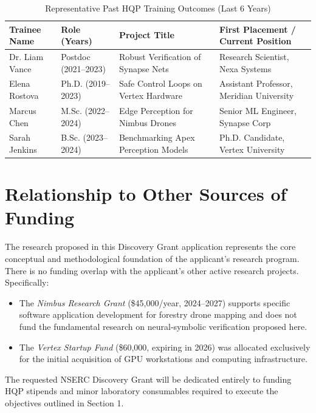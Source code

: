 \documentclass[12pt, letterpaper]{article}
\begin{document}
\begin{table}[htbp]
  \centering
  \caption{Representative Past HQP Training Outcomes (Last 6 Years)}
  \label{tab:past_hqp}
  \small
  \begin{tabularx}{\textwidth}{l l l X}
    \toprule
    \textbf{Trainee Name} & \textbf{Role (Years)} & \textbf{Project Title} & \textbf{First Placement / Current Position} \\
    \midrule
    Dr. Liam Vance & Postdoc (2021--2023) & Robust Verification of Synapse Nets & Research Scientist, Nexa Systems \\
    Elena Rostova & Ph.D. (2019--2023) & Safe Control Loops on Vertex Hardware & Assistant Professor, Meridian University \\
    Marcus Chen & M.Sc. (2022--2024) & Edge Perception for Nimbus Drones & Senior ML Engineer, Synapse Corp \\
    Sarah Jenkins & B.Sc. (2023--2024) & Benchmarking Apex Perception Models & Ph.D. Candidate, Vertex University \\
    \bottomrule
  \end{tabularx}
\end{table}

\section{Relationship to Other Sources of Funding}
The research proposed in this Discovery Grant application represents the core conceptual and methodological foundation of the applicant's research program. There is no funding overlap with the applicant's other active research projects. Specifically:

\begin{itemize}[leftmargin=1.5em, itemsep=3pt]
  \item The \emph{Nimbus Research Grant} (\$45,000/year, 2024--2027) supports specific software application development for forestry drone mapping and does not fund the fundamental research on neural-symbolic verification proposed here.
  \item The \emph{Vertex Startup Fund} (\$60,000, expiring in 2026) was allocated exclusively for the initial acquisition of GPU workstations and computing infrastructure.
\end{itemize}

The requested NSERC Discovery Grant will be dedicated entirely to funding HQP stipends and minor laboratory consumables required to execute the objectives outlined in Section 1.
\end{document}
